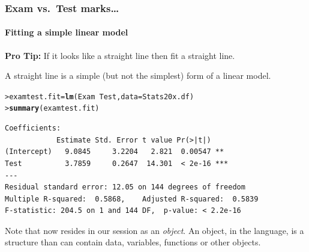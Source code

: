 \documentclass{beamer}\usepackage[]{graphicx}\usepackage[]{xcolor}
\makeatletter
\newcommand{\hlopt}[1]{\textcolor[rgb]{0,0,0}{#1}}%
\newcommand{\hlstd}[1]{\textcolor[rgb]{0.345,0.345,0.345}{#1}}%
\newcommand{\hlkwb}[1]{\textcolor[rgb]{0.69,0.353,0.396}{#1}}%
\newcommand{\hlkwc}[1]{\textcolor[rgb]{0.333,0.667,0.333}{#1}}%
\newcommand{\hlkwd}[1]{\textcolor[rgb]{0.737,0.353,0.396}{\textbf{#1}}}%
\newenvironment{kframe}{%
 \def\at@end@of@kframe{}%
 \ifinner\ifhmode%
  \def\at@end@of@kframe{\end{minipage}}%
  \begin{minipage}{\columnwidth}%
 \fi\fi%
 \def\FrameCommand##1{\hskip\@totalleftmargin \hskip-\fboxsep
 \colorbox{shadecolor}{##1}\hskip-\fboxsep
     \hskip-\linewidth \hskip-\@totalleftmargin \hskip\columnwidth}%
 \MakeFramed {\advance\hsize-\width
   \@totalleftmargin\z@ \linewidth\hsize
   \@setminipage}}%
 {\par\unskip\endMakeFramed%
 \at@end@of@kframe}
\newenvironment{knitrout}{}{} %
\makeatother
\begin{document}


\begin{frame}[fragile]
\frametitle{Exam vs.\ Test marks\ldots}
\framesubtitle{Fitting a simple linear model}
\begin{large}\centering
\textbf{Pro Tip:} If it looks like a straight line then fit a straight line.\\
\end{large}
\vspace{12pt}
A straight line is a simple (but not the simplest) form  of a linear model.

\medskip
\begin{knitrout}\scriptsize
{}\color{fgcolor}\begin{kframe}
\begin{alltt}
\hlstd{> }\hlstd{examtest.fit} \hlkwb{=} \hlkwd{lm}\hlstd{(Exam} \hlopt{~} \hlstd{Test,} \hlkwc{data} \hlstd{= Stats20x.df)}
\hlstd{> }\hlkwd{summary}\hlstd{(examtest.fit)}
\end{alltt}
\end{kframe}
\end{knitrout}

\begin{knitrout}\scriptsize
{}\color{fgcolor}\begin{kframe}
\begin{verbatim}
Coefficients:
            Estimate Std. Error t value Pr(>|t|)    
(Intercept)   9.0845     3.2204   2.821  0.00547 ** 
Test          3.7859     0.2647  14.301  < 2e-16 ***
---
Residual standard error: 12.05 on 144 degrees of freedom
Multiple R-squared:  0.5868,	Adjusted R-squared:  0.5839 
F-statistic: 204.5 on 1 and 144 DF,  p-value: < 2.2e-16
\end{verbatim}
\end{kframe}
\end{knitrout}

Note that  now resides in our  session as an  \emph{object}. An object, in the  language, is a structure than can contain data, variables, functions or other objects.

\end{frame}
\end{document}
